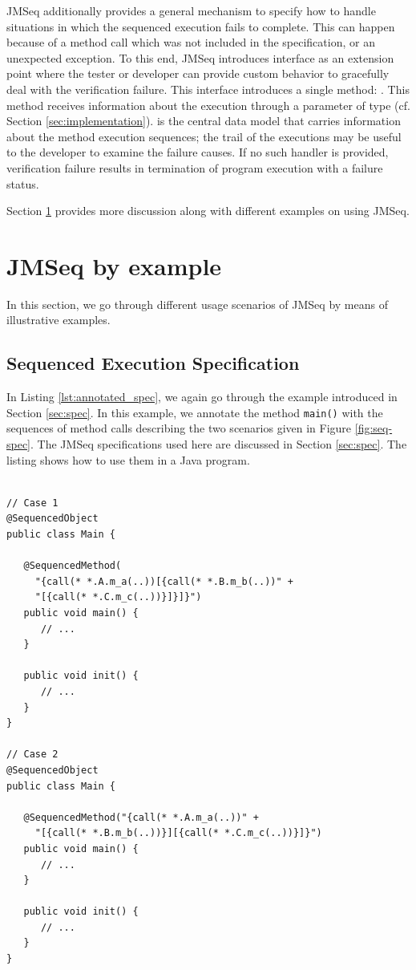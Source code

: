 JMSeq additionally provides a general mechanism to specify how to handle situations in
which the sequenced execution fails to complete. This can happen
because of a method call which was not included in the specification, or
an unexpected exception.
To this end, JMSeq introduces  interface as an
extension point where the tester or developer can provide 
custom behavior to gracefully deal with the verification failure.
This interface
introduces a single method: . 
This method
receives information about the execution through a parameter of
type  (cf. Section \ref{sec:implementation}).
 is the central data model that carries information
about the method execution sequences; the trail of the
executions may be useful to the developer to examine the failure causes.
%
If no such handler is provided, verification failure results in termination 
of program execution with a failure status.

Section \ref{sec:samples} provides more discussion along with different
examples on using JMSeq.

\section{JMSeq by example} \label{sec:samples}
In this section, we go through different usage scenarios of JMSeq 
by means of illustrative examples.

\subsection{Sequenced Execution Specification}
In  Listing \ref{lst:annotated_spec}, we again go through the example
introduced in Section \ref{sec:spec}.
In this example, we annotate the method \texttt{main()} with the sequences of method calls describing the two scenarios
given in Figure \ref{fig:seq-spec}. 
The JMSeq specifications used here are discussed in Section \ref{sec:spec}.
The listing shows how to use them in a Java program.

\lstset{language=Java}
\begin{lstlisting}[label=lst:annotated_spec, caption=Sample annotated specification]

// Case 1
@SequencedObject
public class Main {

   @SequencedMethod(
     "{call(* *.A.m_a(..))[{call(* *.B.m_b(..))" + 
     "[{call(* *.C.m_c(..))}]}]}") 
   public void main() { 
      // ...
   }
   
   public void init() {
      // ...
   }
}

// Case 2
@SequencedObject
public class Main {

   @SequencedMethod("{call(* *.A.m_a(..))" + 
     "[{call(* *.B.m_b(..))}][{call(* *.C.m_c(..))}]}") 
   public void main() {
      // ...
   }
   
   public void init() {
      // ...
   }
}
\end{lstlisting}

